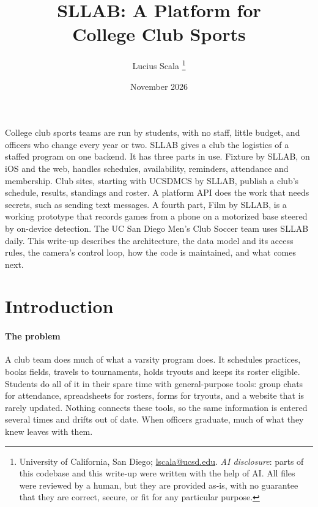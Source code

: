 \documentclass[letterpaper,11pt]{article}
\begin{document}
\title{SLLAB: A Platform for\\College Club Sports}

\author{Lucius Scala%
\thanks{University of California, San Diego; \href{mailto:lscala@ucsd.edu}{lscala@ucsd.edu}.
\textit{AI disclosure}: parts of this codebase and this write-up were written with the help of AI.
All files were reviewed by a human, but they are provided as-is, with no guarantee that they are
correct, secure, or fit for any particular purpose.}}

\date{November 2026}


\begin{titlepage}
\maketitle

College club sports teams are run by students, with no staff, little budget, and officers who
change every year or two. SLLAB gives a club the logistics of a staffed program on one backend.
It has three parts in use. Fixture by SLLAB, on iOS and the web, handles schedules,
availability, reminders, attendance and membership. Club sites, starting with UCSDMCS by SLLAB,
publish a club's schedule, results, standings and roster. A platform API does the work that needs
secrets, such as sending text messages. A fourth part, Film by SLLAB, is a working prototype that
records games from a phone on a motorized base steered by on-device detection. The UC San Diego
Men's Club Soccer team uses SLLAB daily. This write-up describes the architecture, the data model
and its access rules, the camera's control loop, how the code is maintained, and what comes next.

\end{titlepage}

\section{Introduction}\label{s:introduction}

\paragraph{The problem} A club team does much of what a varsity program does. It schedules
practices, books fields, travels to tournaments, holds tryouts and keeps its roster eligible.
Students do all of it in their spare time with general-purpose tools: group chats for attendance,
spreadsheets for rosters, forms for tryouts, and a website that is rarely updated. Nothing
connects these tools, so the same information is entered several times and drifts out of date.
When officers graduate, much of what they knew leaves with them.
\end{document}
